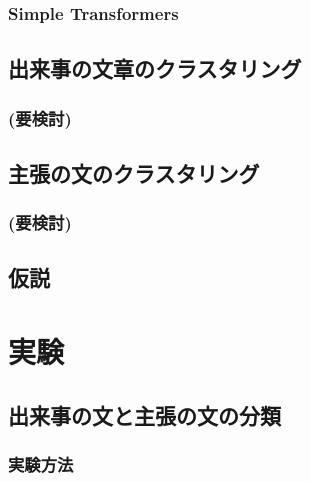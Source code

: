 \documentclass[12pt,a4j]{jreport}
\begin{document}
\subsection{Simple Transformers}


\section{出来事の文章のクラスタリング}


\subsection{(要検討)}


\section{主張の文のクラスタリング}


\subsection{(要検討)}



\section{仮説}


\chapter{実験}


\section{出来事の文と主張の文の分類}


\subsection{実験方法}
\end{document}
